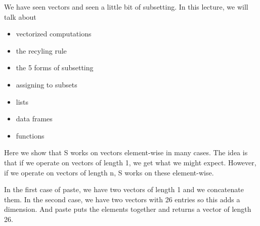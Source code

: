 \documentclass[coloremph,lightbackground,landscape,17pt]{foils}
\begin{document}
\pagecolor{khaki}


We have seen vectors and seen a little bit of subsetting.  In this
lecture, we will talk about
\begin{itemize}
\item vectorized computations
\item the recyling rule
\item the 5 forms of subsetting
\item assigning to subsets
\item lists
\item data frames
\item functions
\end{itemize}


\newcommand{\newslide}[1]{\newpage\begin{center}%
\color{darkblue}{\large\bf #1}\end{center}}




Here we show that S works on vectors element-wise in many cases. The
idea is that if we operate on vectors of length 1, we get what we
might expect.  However, if we operate on vectors of length n,
S works on these element-wise.
\newslide{Vectorized computations}
In the first case of paste, we have two vectors of length
1 and we concatenate them. In the second case, we
have two vectors with 26 entries so this adds
a dimension. And paste puts the elements together
and returns a vector of length 26.
\end{document}
